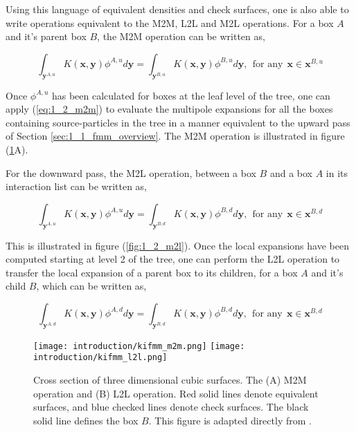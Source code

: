 Using this language of equivalent densities and check surfaces, one is also able to
write operations equivalent to the M2M, L2L and M2L operations. For a box $A$
and it's parent box $B$, the M2M operation can be written as,

\begin{equation}
    \int_{\mathbf{y}^{A,u}} K(\mathbf{x}, \mathbf{y})\phi^{A, u} d\mathbf{y} =   \int_{\mathbf{y}^{B,u}} K(\mathbf{x}, \mathbf{y})\phi^{B, u} d\mathbf{y}, \> \> \text{for any} \> \> \mathbf{x} \in \mathbf{x}^{B, u}
    \label{eq:1_2_m2m}
\end{equation}

Once $\phi^{A, u}$ has been calculated for boxes at the leaf level of the tree,
one can apply (\ref{eq:1_2_m2m}) to evaluate the multipole expansions for all
the boxes containing \gls{source-particles} in the tree in a manner equivalent
to the upward pass of Section \ref{sec:1_1_fmm_overview}. The M2M operation is
illustrated in figure (\ref{fig:1_2_m2m_l2l}A).

For the downward pass, the M2L operation, between a box $B$ and a box $A$ in its
interaction list can be written as,

\begin{equation}
    \int_{\mathbf{y}^{A,u}} K(\mathbf{x}, \mathbf{y})\phi^{A, u} d\mathbf{y} =   \int_{\mathbf{y}^{B,d}} K(\mathbf{x}, \mathbf{y})\phi^{B, d} d\mathbf{y}, \> \> \text{for any} \> \> \mathbf{x} \in \mathbf{x}^{B, d}
\label{eq:1_2_m2l}
\end{equation}

This is illustrated in figure (\ref{fig:1_2_m2l}). Once the local expansions
have  been computed starting at level 2 of the tree, one can perform the L2L
operation to transfer the local expansion of a parent box to its children,
for a box $A$ and it's child $B$, which can be written as,

\begin{equation}
    \int_{\mathbf{y}^{A,d}} K(\mathbf{x}, \mathbf{y})\phi^{A, d} d\mathbf{y} =   \int_{\mathbf{y}^{B,d}} K(\mathbf{x}, \mathbf{y})\phi^{B, d} d\mathbf{y}, \> \> \text{for any} \> \> \mathbf{x} \in \mathbf{x}^{B, d}
    \label{eq:1_2_l2l}
\end{equation}

\begin{figure}[!h]
    \centering
    {\texttt{[image: introduction/kifmm\_m2m.png]}}
    \hfill
  {\texttt{[image: introduction/kifmm\_l2l.png]}}
  \vspace{0pt}
  \caption{Cross section of three dimensional cubic surfaces. The (A) M2M operation and (B) L2L operation. Red solid lines
  denote equivalent surfaces, and blue checked lines denote check surfaces.
  The black solid line defines the box $B$. This figure is adapted directly from \cite{Ying:2004:JCP}.}
  \label{fig:1_2_m2m_l2l}
\end{figure}

